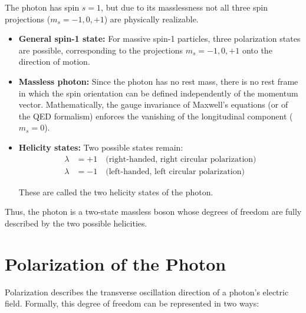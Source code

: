The photon has spin $s=1$, but due to its masslessness not all three spin projections ($m_s=-1,0,+1$) are physically realizable. 

\begin{itemize}
	\item \textbf{General spin-1 state:}  
	For massive spin-1 particles, three polarization states are possible,
	corresponding to the projections $m_s=-1,0,+1$ onto the direction of motion.
	
	\item \textbf{Massless photon:}  
	Since the photon has no rest mass, there is no rest frame in which the spin orientation can be defined independently of the momentum vector.  
	Mathematically, the gauge invariance of Maxwell’s equations (or of the QED formalism) enforces the vanishing of the longitudinal component ($m_s=0$).
	
	\item \textbf{Helicity states:}  
	Two possible states remain:
	\begin{align*}
		\lambda &= +1 \quad \text{(right-handed, right circular polarization)}\\
		\lambda &= -1 \quad \text{(left-handed, left circular polarization)}
	\end{align*}
	
	These are called the two helicity states of the photon.
\end{itemize}

\noindent
Thus, the photon is a two-state massless boson whose degrees of freedom are fully described by the two possible helicities.

\section{Polarization of the Photon}
\label{anhangA:polarisation}

Polarization describes the transverse oscillation direction of a photon’s electric field. Formally, this degree of freedom can be represented in two ways:

